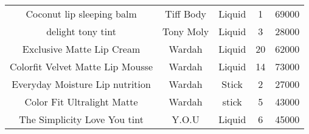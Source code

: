 \begin{table}[htbp]
\begin{tabular}{ccccc}
        Coconut lip sleeping balm           & Tiff Body         & Liquid                       & 1               & 69000          \\
        delight tony tint                   & Tony Moly         & Liquid                       & 3               & 28000          \\
        Exclusive Matte Lip Cream           & Wardah            & Liquid                       & 20              & 62000          \\
        Colorfit Velvet Matte Lip Mousse    & Wardah            & Liquid                       & 14              & 73000          \\
        Everyday Moisture Lip nutrition     & Wardah            & Stick                        & 2               & 27000          \\
        Color Fit Ultralight Matte          & Wardah            & stick                        & 5               & 43000          \\
        The Simplicity Love You tint        & Y.O.U             & Liquid                       & 6               & 45000          \\
    \end{tabular}
\end{table}\restoregeometry
